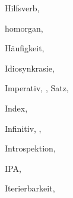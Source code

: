 \begin{theindex}
  \indexspace

  \item Hilfsverb, 
  \item homorgan, 
  \item Häufigkeit, 

  \indexspace

  \item Idiosynkrasie, 
  \item Imperativ, , 
    \subitem Satz, 
  \item Index, 
  \item Infinitiv, , 
  \item Introspektion, 
  \item IPA, 
  \item Iterierbarkeit, 

  \indexspace


\end{theindex}
